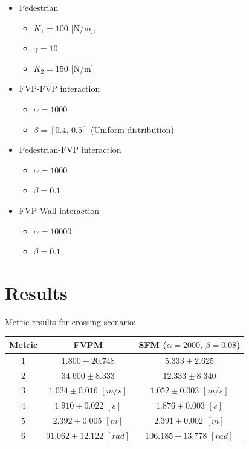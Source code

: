 \documentclass[english]{article}
\providecommand{\tabularnewline}{\\}
\begin{document}
\begin{itemize}
    \item Pedestrian 
    
    \begin{itemize}
        \item $K_{1}=100$ {[}N/m{]}, 
        \item $\gamma=10$ 
        \item $K_{2}=150$ {[}N/m{]} 
    \end{itemize}
    \item FVP-FVP interaction 
    
    \begin{itemize}
        \item $\alpha=1000$ 
        \item $\beta=[0.4,\,0.5]$ (Uniform distribution) 
        \end{itemize}
    \item Pedestrian-FVP interaction 
    
    \begin{itemize}
        \item $\alpha=1000$ 
        \item $\beta=0.1$ 
    \end{itemize}
    \item FVP-Wall interaction 
    
    \begin{itemize}
        \item $\alpha=10000$ 
        \item $\beta=0.1$ 
    \end{itemize}
\end{itemize}

\section{Results}

Metric results for crossing scenario:

\begin{tabular}{|c|c|c|}
    \hline 
    Metric  & {\scriptsize{FVPM}} & {\scriptsize{SFM ($\alpha=2000,\,\beta=0.08$)}}\tabularnewline
    \hline 
    \hline 
    $1$  & {\scriptsize{$1.800\pm20.748$}} & {\scriptsize{$5.333\pm2.625$}}\tabularnewline
    \hline 
    $2$  & {\scriptsize{$34.600\pm8.333$}} & {\scriptsize{$12.333\pm8.340$}}\tabularnewline
    \hline 
    $3$  & {\scriptsize{$1.024\pm0.016$ $[m/s]$}} & {\scriptsize{$1.052\pm0.003$ $[m/s]$}}\tabularnewline
    \hline 
    $4$  & {\scriptsize{$1.910\pm0.022$ $[s]$}} & {\scriptsize{$1.876\pm0.003$ $[s]$}}\tabularnewline
    \hline 
    $5$  & {\scriptsize{$2.392\pm0.005$ $[m]$}} & {\scriptsize{$2.391\pm0.002$ $[m]$}}\tabularnewline
    \hline 
    $6$  & {\scriptsize{$91.062\pm12.122$ $[rad]$}} & {\scriptsize{$106.185\pm13.778$ $[rad]$}}\tabularnewline
    \hline 
\end{tabular}
\end{document}
